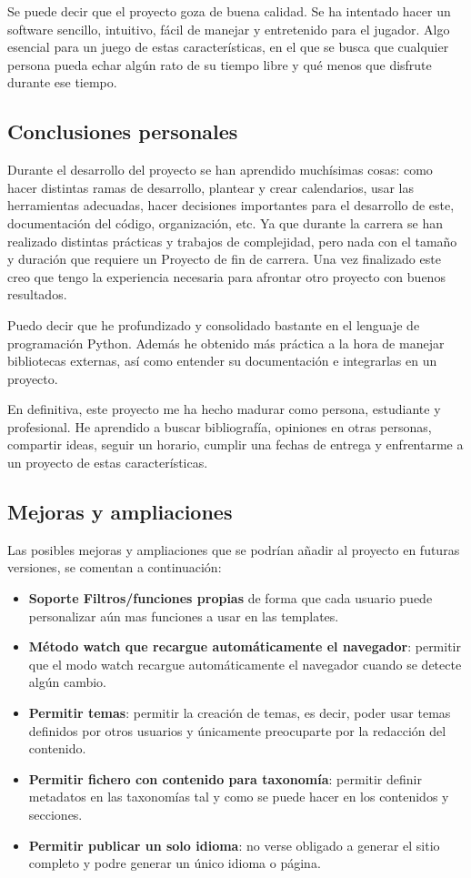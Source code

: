 \documentclass[a4paper,12pt]{article}
\begin{document}
Se puede decir que el proyecto goza de buena calidad. Se ha intentado hacer un software sencillo,
intuitivo, fácil de manejar y entretenido para el jugador. Algo esencial para un juego de estas
características, en el que se busca que cualquier persona pueda echar algún rato de su tiempo libre y qué menos
que disfrute durante ese tiempo.

\subsection{Conclusiones personales}

Durante el desarrollo del proyecto se han aprendido muchísimas cosas: como hacer distintas ramas de
desarrollo, plantear y crear calendarios, usar las herramientas adecuadas, hacer decisiones importantes
para el desarrollo de este, documentación del código, organización, etc. Ya que durante la carrera se
han realizado distintas prácticas y trabajos de complejidad, pero nada con el tamaño y duración que
requiere un Proyecto de fin de carrera. Una vez finalizado este creo que tengo la experiencia necesaria
para afrontar otro proyecto con buenos resultados.

Puedo decir que he profundizado y consolidado bastante en el lenguaje de programación Python.
Además he obtenido más práctica a la hora de manejar bibliotecas
externas, así como entender su documentación e integrarlas en un proyecto.

En definitiva, este proyecto me ha hecho madurar como persona, estudiante y profesional. He aprendido a buscar
bibliografía, opiniones en otras personas, compartir ideas, seguir un horario, cumplir una fechas de
entrega y enfrentarme a un proyecto de estas características.

\subsection{Mejoras y ampliaciones}

Las posibles mejoras y ampliaciones que se podrían añadir al proyecto en futuras versiones, se comentan
a continuación:

\begin{itemize}
    \item \textbf{Soporte Filtros/funciones propias} de forma que cada usuario puede personalizar aún mas
    funciones a usar en las templates.
    \item \textbf{Método watch que recargue automáticamente el navegador}: permitir que el modo watch recargue
    automáticamente el navegador cuando se detecte algún cambio.
    \item \textbf{Permitir temas}: permitir la creación de temas, es decir, poder usar temas definidos
    por otros usuarios y únicamente preocuparte por la redacción del contenido.
    \item \textbf{Permitir fichero con contenido para taxonomía}: permitir definir metadatos en las taxonomías
    tal y como se puede hacer en los contenidos y secciones.
    \item \textbf{Permitir publicar un solo idioma}: no verse obligado a generar el sitio completo y podre generar
    un único idioma o página.
\end{itemize}
\end{document}
